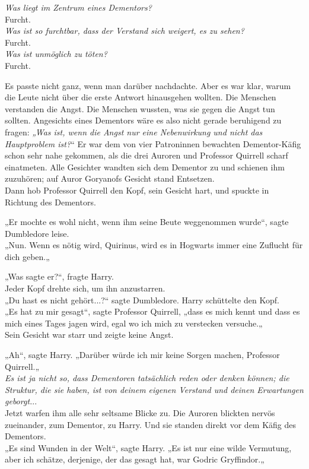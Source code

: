 {\emph{Was liegt im Zentrum eines Dementors?}\\ Furcht.\\ \emph{Was ist so furchtbar, dass der Verstand sich weigert, es zu sehen?}\\ Furcht.\\ \emph{Was ist unmöglich zu töten?}\\ Furcht.

Es passte nicht ganz, wenn man darüber nachdachte. Aber es war klar, warum die Leute nicht über die erste Antwort hinausgehen wollten. Die Menschen verstanden die Angst. Die Menschen wussten, was sie gegen die Angst tun sollten. Angesichts eines Dementors wäre es also nicht gerade beruhigend zu fragen: \emph{„Was ist, wenn die Angst nur eine Nebenwirkung und nicht das} \emph{Hauptproblem ist?}“ Er war dem von vier Patroninnen bewachten Dementor-Käfig schon sehr nahe gekommen, als die drei Auroren und Professor Quirrell scharf einatmeten. Alle Gesichter wandten sich dem Dementor zu und schienen ihm zuzuhören; auf Auror Goryanofs Gesicht stand Entsetzen.\\ Dann hob Professor Quirrell den Kopf, sein Gesicht hart, und spuckte in Richtung des Dementors.

„Er mochte es wohl nicht, wenn ihm seine Beute weggenommen wurde“, sagte Dumbledore leise.\\ „Nun. Wenn es nötig wird, Quirinus, wird es in Hogwarts immer eine Zuflucht für dich geben.„

„Was sagte er?“, fragte Harry.\\ Jeder Kopf drehte sich, um ihn anzustarren.\\ „Du hast es nicht gehört...?“ sagte Dumbledore. Harry schüttelte den Kopf.\\ „Es hat zu mir gesagt“, sagte Professor Quirrell, „dass es mich kennt und dass es mich eines Tages jagen wird, egal wo ich mich zu verstecken versuche.„\\ Sein Gesicht war starr und zeigte keine Angst.

„Ah“, sagte Harry. „Darüber würde ich mir keine Sorgen machen, Professor Quirrell.„\\ \emph{Es ist ja nicht so, dass Dementoren tatsächlich reden oder denken können; die Struktur, die sie haben, ist von deinem eigenen Verstand und deinen Erwartungen geborgt.}..\\ Jetzt warfen ihm alle sehr seltsame Blicke zu. Die Auroren blickten nervös zueinander, zum Dementor, zu Harry. Und sie standen direkt vor dem Käfig des Dementors.\\ „Es sind Wunden in der Welt“, sagte Harry. „Es ist nur eine wilde Vermutung, aber ich schätze, derjenige, der das gesagt hat, war Godric Gryffindor.„

}
